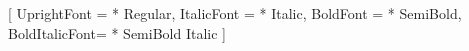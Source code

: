 \setmainfont{EB Garamond}[
  UprightFont   = * Regular,
  ItalicFont    = * Italic,
  BoldFont      = * SemiBold,
  BoldItalicFont= * SemiBold Italic
]

\usepackage{newtxmath}


\usepackage[bb=libus,bbscaled=1.0]{mathalpha}



\usepackage{fancyhdr}
\pagestyle{fancy}
\fancyhf{}                          %


\renewcommand{\sectionmark}[1]{%
  \markboth{\thesection\enspace\enspace #1}{}%
}

\newcommand{\SectionHeaderTitle}{}

\renewcommand{\sectionmark}[1]{%
  \markboth{#1}{}%
  \gdef\SectionHeaderTitle{#1}%
}


\fancyhead[L]{%
  \nouppercase{%
    \small %
    \normalfont\thesection\enspace %
    \textsc{\SectionHeaderTitle}   %
  }%
}

\fancyhead[R]{\small\thepage}
\renewcommand{\headrulewidth}{0pt}


\usepackage{titlesec}
\usepackage{etoolbox} %


